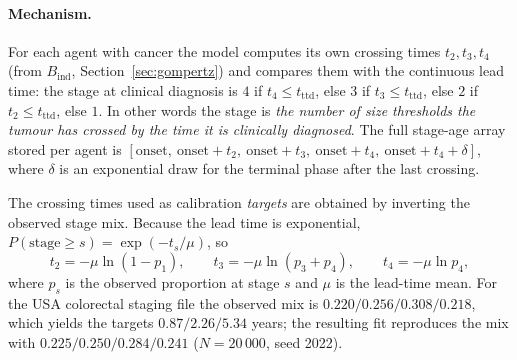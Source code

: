 \documentclass[12pt,a4paper]{article}
\newcommand{\mech}[1]{\paragraph{Mechanism.} #1}
\begin{document}
\mech{For each agent with cancer the model computes its own crossing times $t_2, t_3, t_4$ (from
$B_{\text{ind}}$, Section~\ref{sec:gompertz}) and compares them with the continuous lead time: the stage
at clinical diagnosis is $4$ if $t_4 \le t_{\text{ttd}}$, else $3$ if $t_3 \le t_{\text{ttd}}$, else $2$
if $t_2 \le t_{\text{ttd}}$, else $1$. In other words the stage is \emph{the number of size thresholds
the tumour has crossed by the time it is clinically diagnosed}. The full stage-age array stored per agent
is $[\text{onset},\ \text{onset}+t_2,\ \text{onset}+t_3,\ \text{onset}+t_4,\ \text{onset}+t_4+\delta]$,
where $\delta$ is an exponential draw for the terminal phase after the last crossing.

The crossing times used as calibration \emph{targets} are obtained by inverting the observed stage mix.
Because the lead time is exponential, $P(\text{stage} \ge s) = \exp(-t_s/\mu)$, so
\[
t_2 = -\mu \ln(1 - p_1), \qquad t_3 = -\mu \ln(p_3 + p_4), \qquad t_4 = -\mu \ln p_4 ,
\]
where $p_s$ is the observed proportion at stage $s$ and $\mu$ is the lead-time mean. For the USA
colorectal staging file the observed mix is $0.220/0.256/0.308/0.218$, which yields the targets
$0.87/2.26/5.34$ years; the resulting fit reproduces the mix with $0.225/0.250/0.284/0.241$
($N = 20\,000$, seed 2022).}
\end{document}
